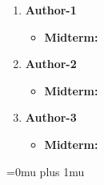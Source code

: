 \documentclass[twocolumn]{article}
\begin{document}
\begin{enumerate}
\item {\bf Author-1}
\begin{itemize}
\item {\bf Midterm:}
\end{itemize}
\item {\bf Author-2}
\begin{itemize}
\item {\bf Midterm:}
\end{itemize}
\item {\bf Author-3}
\begin{itemize}
\item {\bf Midterm:}
\end{itemize}
\end{enumerate}

\Urlmuskip=0mu plus 1mu\relax


\end{document}
